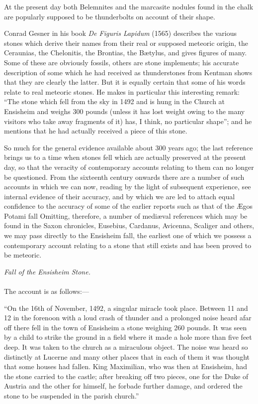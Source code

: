 \documentclass[a4paper, 11pt, oneside]{article}
\begin{document}
At the present day both Belemnites and the marcasite nodules found in the chalk are popularly supposed to be thunderbolts on account of their shape. 

Conrad Gesner in his book \emph{De Figuris Lapidum} (1565) describes the various stones which derive their names from their real or supposed meteoric origin, the Ceraunias, the Chelonitis, the Brontias, the Bætylus, and gives figures of many. Some of these are obviously fossils, others are stone implements; his accurate description of some which he had received as thunderstones from Kentman shows that they are clearly the latter. But it is equally certain that some of his words relate to real meteoric stones. He makes in particular this interesting remark: ``The stone which fell from the sky in 1492 and is hung in the Church at Ensisheim and weighs 300 pounds (unless it has lost weight owing to the many visitors who take away fragments of it) has, I think, no particular shape''; and he mentions that he had actually received a piece of this stone. 

So much for the general evidence available about 300 years ago; the last reference brings us to a time when stones fell which are actually preserved at the present day, so that the veracity of contemporary accounts relating to them can no longer be questioned. From the sixteenth century onwards there are a number of such accounts in which we can now, reading by the light of subsequent experience, see internal evidence of their accuracy, and by which we are led to attach equal confidence to the accuracy of some of the earlier reports such as that of the Ægos Potami fall Omitting, therefore, a number of mediæval references which may be found in the Saxon chronicles, Eusebius, Cardanus, Avicenna, Scaliger and others, we may pass directly to the Ensisheim fall, the earliest one of which we possess a contemporary account relating to a stone that still exists and has been proved to be meteoric. 
\begin{center}
\emph{Fall of the Ensisheim Stone.}
\end{center}
\paragraph{}
The account is as follows:--- 

``On the 16th of November, 1492, a singular miracle took place. Between 11 and 12 in the forenoon with a loud crash of thunder and a prolonged noise heard afar off there fell in the town of Ensisheim a stone weighing 260 pounds. It was seen by a child to strike the ground in a field where it made a hole more than five feet deep. It was taken to the church as a miraculous object. The noise was heard so distinctly at Lucerne and many other places that in each of them it was thought that some houses had fallen. King Maximilian, who was then at Ensisheim, had the stone carried to the castle; after breaking off two pieces, one for the Duke of Austria and the other for himself, he forbade further damage, and ordered the stone to be suspended in the parish church.'' 
\end{document}
